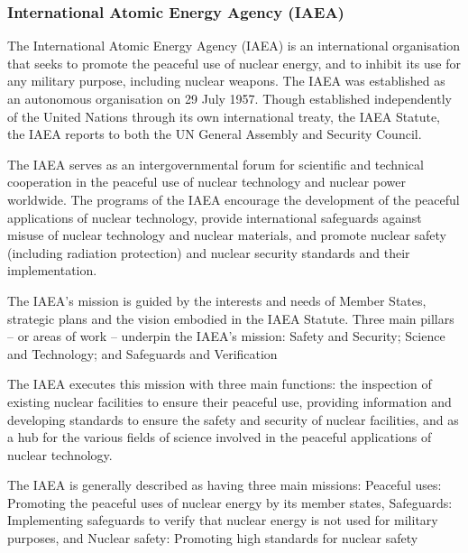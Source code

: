 \documentclass[twocolumn,a4paper]{article}
\begin{document}
\subsubsection{International Atomic Energy Agency (IAEA)}
The International Atomic Energy Agency (IAEA) is an international
organisation that seeks to promote the peaceful use of nuclear energy,
and to inhibit its use for any military purpose, including nuclear
weapons. The IAEA was established as an autonomous organisation on 29
July 1957. Though established independently of the United
Nations through its own international treaty, the IAEA Statute, the
IAEA reports to both the UN General Assembly and Security Council.

The IAEA serves as an intergovernmental forum for scientific and
technical cooperation in the peaceful use of nuclear
technology and nuclear power worldwide.  The programs of the IAEA
encourage the development of the peaceful applications of nuclear
technology, provide international safeguards against misuse of nuclear
technology and nuclear materials, and promote nuclear
safety (including radiation protection) and nuclear security standards
and their implementation.

The IAEA's mission is guided by the interests and needs of Member
States, strategic plans and the vision embodied in the IAEA
Statute. Three main pillars -- or areas of work -- underpin the IAEA's
mission: Safety and Security; Science and Technology; and Safeguards
and Verification

The IAEA executes this mission with three main functions: the
inspection of existing nuclear facilities to ensure their peaceful
use, providing information and developing standards to ensure the
safety and security of nuclear facilities, and as a hub for the
various fields of science involved in the peaceful applications of
nuclear technology.

The IAEA is generally described as having three main missions:
Peaceful uses: Promoting the peaceful uses of nuclear energy by its
member states, Safeguards: Implementing safeguards to verify that
nuclear energy is not used for military purposes, and Nuclear safety:
Promoting high standards for nuclear safety
\end{document}
